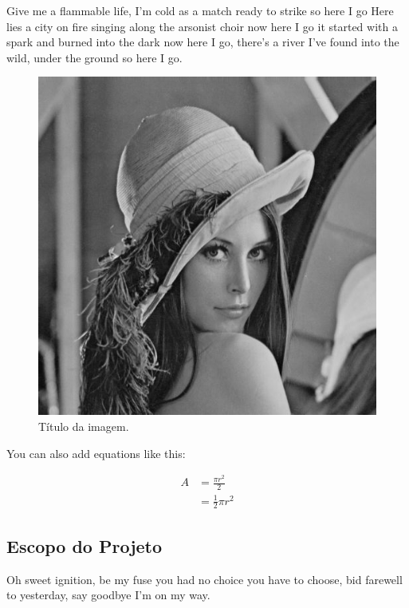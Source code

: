 \documentclass[12pt]{article}
\begin{document}
	Give me a flammable life, I'm cold as a match ready to strike so here I go Here lies a city on fire singing along the arsonist choir now here I go it started with a spark and burned into the dark now here I go, there's a river I've found into the wild, under the ground so here I go.
	
	\begin{figure}[!htb]
	    \centering
	    \includegraphics[scale=0.3]{../imagens/lena.jpg}
	    \caption{Título da imagem.}
	    \label{fig:lena}
	\end{figure}
	
	You can also add equations like this:

	\begin{equation} \label{eq1}
		\begin{split}
		A & = \frac{\pi r^2}{2} \\
		 & = \frac{1}{2} \pi r^2
		\end{split}
	\end{equation}

	\subsection{Escopo do Projeto}
	
	Oh sweet ignition, be my fuse you had no choice you have to choose, bid farewell to yesterday, say goodbye I'm on my way.
\end{document}

